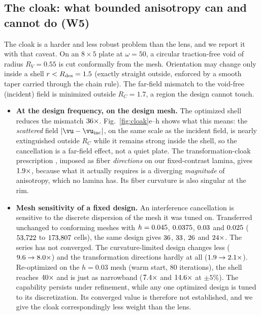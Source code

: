 \subsection{The cloak: what bounded anisotropy can and cannot do (W5)}\label{sec:cloak}
The cloak is a harder and less robust problem than the lens, and we report it with that caveat. On an
$8\times5$ plate at $\omega=50$, a circular traction-free void of radius $R_V=0.55$ is cut conformally from the
mesh. Orientation may change only inside a shell $r<R_{\rm des}=1.5$ (exactly straight outside, enforced by a
smooth taper carried through the chain rule). The far-field mismatch to the void-free (incident) field is
minimized outside $R_C=1.7$, a region the design cannot touch.
\begin{itemize}[itemsep=1pt]
\item \textbf{At the design frequency, on the design mesh.} The optimized shell reduces the mismatch
  $36\times$. Fig.~\ref{fig:cloak}e--h shows what this means: the \emph{scattered} field
  $|\vu-\vu_{\rm inc}|$, on the same scale as the incident field, is nearly extinguished outside $R_C$ while it
  remains strong inside the shell, so the cancellation is a far-field effect, not a quiet plate. The
  transformation-cloak prescription \cite{pendry2006,norris2008}, imposed as fiber \emph{directions} on our
  fixed-contrast lamina, gives $1.9\times$, because what it actually requires is a diverging
  \emph{magnitude} of anisotropy, which no lamina has. Its fiber curvature is also singular at the rim.
\item \textbf{Mesh sensitivity of a fixed design.} An interference cancellation is sensitive to the
  discrete dispersion of the mesh it was tuned on. Transferred unchanged to conforming meshes with
  $h=0.045$, $0.0375$, $0.03$ and $0.025$ ($53{,}722$ to $173{,}807$ cells), the same design gives
  $36$, $33$, $26$ and $24\times$. The series has not converged. The curvature-limited
  design changes less ($9.6\to8.0\times$) and the transformation directions hardly at all
  ($1.9\to2.1\times$). Re-optimized on the $h=0.03$ mesh (warm start, 80 iterations), the shell
  reaches $40\times$ and is just as narrowband ($7.4\times$ and $14.6\times$ at
  $\pm5\%$). The capability persists under refinement, while any one optimized design is tuned to its
  discretization. Its converged value is therefore not established, and we give the cloak correspondingly
  less weight than the lens.

\end{itemize}
